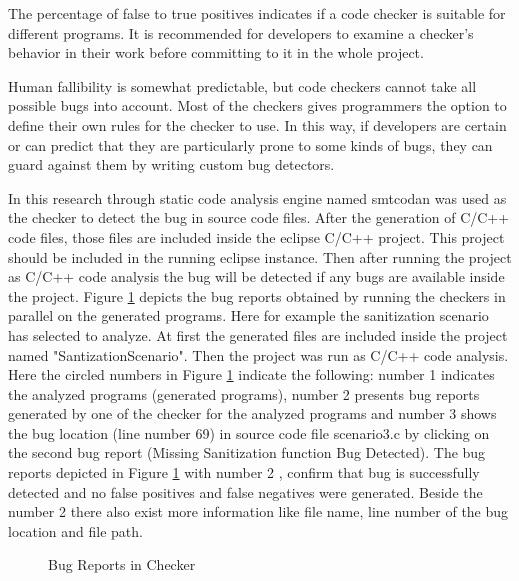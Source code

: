 The percentage of false to true positives indicates if a code checker is suitable for different programs. It is recommended for developers to examine a checker's behavior in their work before committing to it in the whole project. 

Human fallibility is somewhat predictable, but code checkers cannot take all possible bugs into account. Most of the checkers gives programmers the option to define their own rules for the checker to use. In this way, if developers are certain or can predict that they
are particularly prone to some kinds of bugs, they can guard against them by writing custom bug detectors. 

In this research through static code analysis engine named smtcodan was used as the checker to detect the bug in source code files. After the generation of C/C++ code files, those files are included inside the eclipse C/C++ project. This project should be included in the running eclipse instance. Then after running the project as C/C++ code analysis the bug will be detected if any bugs are available inside the project. Figure \ref{bugDetection} depicts the bug reports obtained by running the checkers in parallel on the generated programs. Here for example the sanitization scenario has selected to analyze. At first the generated files are included inside the project named "SantizationScenario". Then the project was run as C/C++ code analysis. Here the circled numbers in Figure \ref{bugDetection} indicate the following: number 1 indicates the analyzed programs (generated programs), number
2 presents bug reports generated by one of the checker for the analyzed programs and number 3 shows the
bug location (line number 69) in source code file scenario3.c by
clicking on the second bug report (Missing Sanitization function Bug
Detected). The bug reports depicted in Figure \ref{bugDetection} with number
2 , confirm that bug is successfully detected and no
false positives and false negatives were generated. Beside the number 2 there also exist more information like file name, line number of the bug location and file path. 

\begin{figure}[htbp]
	\centering
	\label{bugDetection}
	\caption{Bug Reports in Checker}
\end{figure}

